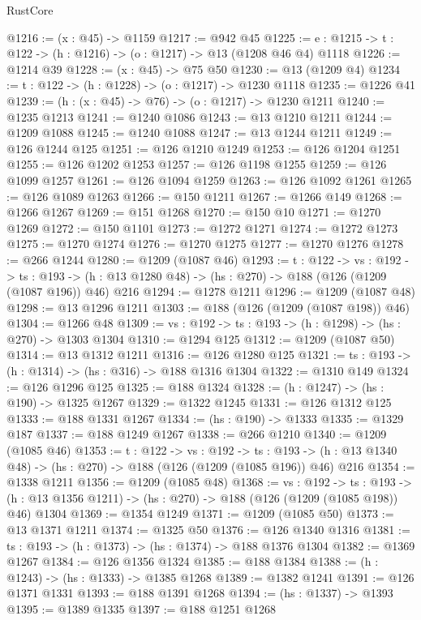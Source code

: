 \begin{lexlean}{RustCore}
\begin{coremodule}
@1216 := (x : @45) -> @1159
@1217 := @942 @45
@1225 := {e : @1215} -> {t : @122} -> (h : @1216) -> (o : @1217) -> @13 (@1208 @46 @4) @1118
@1226 := @1214 @39
@1228 := (x : @45) -> @75 @50
@1230 := @13 (@1209 @4)
@1234 := {t : @122} -> (h : @1228) -> (o : @1217) -> @1230 @1118
@1235 := @1226 @41
@1239 := (h : (x : @45) -> @76) -> (o : @1217) -> @1230 @1211
@1240 := @1235 @1213
@1241 := @1240 @1086
@1243 := @13 @1210 @1211
@1244 := @1209 @1088
@1245 := @1240 @1088
@1247 := @13 @1244 @1211
@1249 := @126 @1244 @125
@1251 := @126 @1210 @1249
@1253 := @126 @1204 @1251
@1255 := @126 @1202 @1253
@1257 := @126 @1198 @1255
@1259 := @126 @1099 @1257
@1261 := @126 @1094 @1259
@1263 := @126 @1092 @1261
@1265 := @126 @1089 @1263
@1266 := @150 @1211
@1267 := @1266 @149
@1268 := @1266 @1267
@1269 := @151 @1268
@1270 := @150 @10
@1271 := @1270 @1269
@1272 := @150 @1101
@1273 := @1272 @1271
@1274 := @1272 @1273
@1275 := @1270 @1274
@1276 := @1270 @1275
@1277 := @1270 @1276
@1278 := @266 @1244
@1280 := @1209 (@1087 @46)
@1293 := {t : @122} ->
  {vs : @192} ->
  {ts : @193} -> (h : @13 @1280 @48) -> (hs : @270) -> @188 (@126 (@1209 (@1087 @196)) @46) @216
@1294 := @1278 @1211
@1296 := @1209 (@1087 @48)
@1298 := @13 @1296 @1211
@1303 := @188 (@126 (@1209 (@1087 @198)) @46)
@1304 := @1266 @48
@1309 := {vs : @192} -> {ts : @193} -> (h : @1298) -> (hs : @270) -> @1303 @1304
@1310 := @1294 @125
@1312 := @1209 (@1087 @50)
@1314 := @13 @1312 @1211
@1316 := @126 @1280 @125
@1321 := {ts : @193} -> (h : @1314) -> (hs : @316) -> @188 @1316 @1304
@1322 := @1310 @149
@1324 := @126 @1296 @125
@1325 := @188 @1324
@1328 := (h : @1247) -> (hs : @190) -> @1325 @1267
@1329 := @1322 @1245
@1331 := @126 @1312 @125
@1333 := @188 @1331 @1267
@1334 := (hs : @190) -> @1333
@1335 := @1329 @187
@1337 := @188 @1249 @1267
@1338 := @266 @1210
@1340 := @1209 (@1085 @46)
@1353 := {t : @122} ->
  {vs : @192} ->
  {ts : @193} -> (h : @13 @1340 @48) -> (hs : @270) -> @188 (@126 (@1209 (@1085 @196)) @46) @216
@1354 := @1338 @1211
@1356 := @1209 (@1085 @48)
@1368 := {vs : @192} ->
  {ts : @193} -> (h : @13 @1356 @1211) -> (hs : @270) -> @188 (@126 (@1209 (@1085 @198)) @46) @1304
@1369 := @1354 @1249
@1371 := @1209 (@1085 @50)
@1373 := @13 @1371 @1211
@1374 := @1325 @50
@1376 := @126 @1340 @1316
@1381 := {ts : @193} -> (h : @1373) -> (hs : @1374) -> @188 @1376 @1304
@1382 := @1369 @1267
@1384 := @126 @1356 @1324
@1385 := @188 @1384
@1388 := (h : @1243) -> (hs : @1333) -> @1385 @1268
@1389 := @1382 @1241
@1391 := @126 @1371 @1331
@1393 := @188 @1391 @1268
@1394 := (hs : @1337) -> @1393
@1395 := @1389 @1335
@1397 := @188 @1251 @1268

\end{coremodule}
\end{lexlean}
